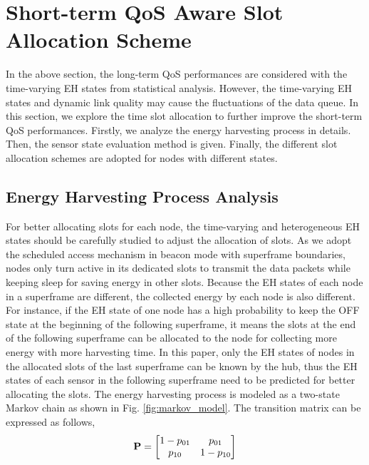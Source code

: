 \documentclass[journal,10pt]{IEEEtran}
\begin{document}
\section{Short-term QoS Aware Slot Allocation Scheme} \label{sec:QASAS}
In the above section, the long-term QoS performances are considered with the time-varying EH states from statistical analysis. However, the time-varying EH states and dynamic link quality may cause the fluctuations of the data queue. In this section, we explore the time slot allocation to further improve the short-term QoS performances. Firstly, we analyze the energy harvesting process in details. Then, the sensor state evaluation method is given. Finally, the different slot allocation schemes are adopted for nodes with different states.

\subsection{Energy Harvesting Process Analysis}
For better allocating slots for each node, the time-varying and heterogeneous EH states should be carefully studied to adjust the allocation of slots.
As we adopt the scheduled access mechanism in beacon mode with superframe boundaries, nodes only turn active in its dedicated slots to transmit the data packets while keeping sleep for saving energy in other slots. 
Because the EH states of each node in a superframe are different, the collected energy by each node is also different.
For instance, if the EH state of one node has a high probability to keep the OFF state at the beginning of the following superframe, it means the slots at the end of the following superframe can be allocated to the node for collecting more energy with more harvesting time.
In this paper, only the EH states of nodes in the allocated slots of the last superframe can be known by the hub, thus the EH states of each sensor in the following superframe need to be predicted for better allocating the slots.
The energy harvesting process is modeled as a two-state Markov chain as shown in Fig. \ref{fig:markov_model}. The transition matrix can be expressed as follows,
\begin{equation}
{\rm \textbf{P}} = \left[ {
\begin{matrix}
   {1 - {p_{01}}} & {{p_{01}}}  \cr 
   {{p_{10}}} & {1 - {p_{10}}}  \cr 
\end{matrix} 
 } \right]
\end{equation}
\end{document}
